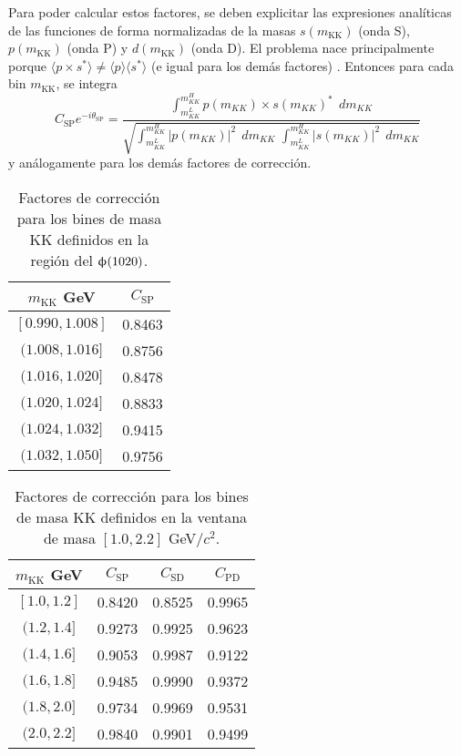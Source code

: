 Para poder calcular estos factores, se deben explicitar las expresiones analíticas de las funciones de forma normalizadas de la masas  $s(m_{\text{KK}})$ (onda S), $p(m_{\text{KK}})$ (onda P)  y $d(m_{\text{KK}})$ (onda D). El problema nace principalmente porque $\langle p \times s^* \rangle \neq \langle p \rangle \langle s^* \rangle$ (e igual para los demás factores) \cite{Xie:1461783}. Entonces para cada bin $m_{\text{KK}}$, se integra  
\begin{equation}
C_{\text{SP}} e^{-i \theta_{\text{SP}}} =
\frac{\int_{m_{KK}^L}^{m_{KK}^H} { p(m_{KK}) \times s(m_{KK})^*} \:\:d m_{KK}}
{\sqrt{\int_{m_{KK}^L}^{m_{KK}^H} { |p(m_{KK})|^2}  \:\:d m_{KK} \,\,\int_{m_{KK}^L}^{m_{KK}^H} { |s(m_{KK})|^2}  \:\:d m_{KK}}}
\end{equation}
y análogamente para los demás factores de corrección.


\begin{table}[H]
\centering
\begin{tabular}{c|c}
\toprule
$m_{\text{KK}}$ GeV & $C_{\text{SP}}$ \\ \midrule
$[0.990,1.008]$ & 0.8463  \\
$(1.008,1.016]$ & 0.8756  \\
$(1.016,1.020]$ & 0.8478  \\
$(1.020,1.024]$ & 0.8833  \\
$(1.024,1.032]$ & 0.9415  \\
$(1.032,1.050]$ & 0.9756  \\
\bottomrule
\end{tabular}
\caption{Factores de corrección para los bines de masa KK definidos en la región del $\upphi(1020)$.}	
\end{table}


\begin{table}[H]
\centering
\begin{tabular}{c|ccc}
\toprule
$m_{\text{KK}}$ GeV & $C_{\text{SP}}$ & $C_{\text{SD}}$ & $C_{\text{PD}}$\\ \midrule
$[1.0,1.2]$ & 0.8420 & 0.8525 & 0.9965 \\
$(1.2,1.4]$ & 0.9273 & 0.9925 & 0.9623 \\
$(1.4,1.6]$ & 0.9053 & 0.9987 & 0.9122 \\
$(1.6,1.8]$ & 0.9485 & 0.9990 & 0.9372 \\
$(1.8,2.0]$ & 0.9734 & 0.9969 & 0.9531 \\
$(2.0,2.2]$ & 0.9840 & 0.9901 & 0.9499 \\
\bottomrule
\end{tabular}
\caption{Factores de corrección para los bines de masa KK definidos en la ventana de masa $[1.0,2.2]$ GeV$/c^2$.}	
\end{table}





